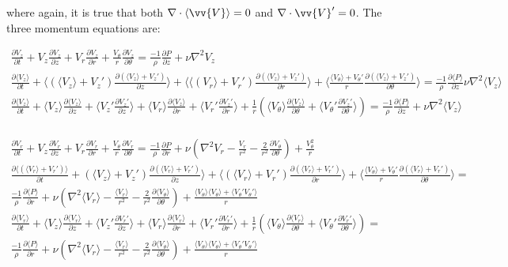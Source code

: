\documentclass[10pt]{article}
\newcommand{\beqa}{\begin{equation}\begin{aligned}}
\newcommand{\eeqa}{\end{aligned}\end{equation}}
\newcommand{\la}{\langle}
\newcommand{\ra}{\rangle}
\begin{document}
\begin{flushleft}
where again, it is true that both \(\nabla\cdot\la \vv{V}\ra=0\) and \(\nabla\cdot\vv{V}'=0\). The three momentum equations are:

\beqa
\frac{\partial V_z}{\partial t}+V_z\frac{\partial V_z}{\partial z}+V_r\frac{\partial V_z}{\partial r}+\frac{V_{\theta}}{r}\frac{\partial V_z}{\partial\theta}=\frac{-1}{\rho}\frac{\partial P}{\partial z}+\nu\nabla^2 V_z\\
\frac{\partial \la V_z\ra}{\partial t}+\la (\la V_z\ra + V_z')\frac{\partial (\la V_z\ra + V_z')}{\partial z}\ra+\la \la (V_r\ra+V_r')\frac{\partial (\la V_z\ra + V_z')}{\partial r}\ra+\la\frac{\la V_{\theta}\ra+V_{\theta}'}{r}\frac{\partial (\la V_z\ra + V_z')}{\partial\theta}\ra=\frac{-1}{\rho}\frac{\partial \la P\ra}{\partial z}\nu\nabla^2\la V_z\ra\\
\frac{\partial \la V_z\ra}{\partial t}+\la V_z\ra\frac{\partial \la V_z\ra}{\partial z}+\la V_z'\frac{\partial V_z'}{\partial z}\ra+\la V_r\ra\frac{\partial \la V_z\ra}{\partial r}+\la V_r'\frac{\partial V_z'}{\partial r}\ra+\frac{1}{r}\left(\la V_{\theta}\ra\frac{\partial\la V_z\ra}{\partial\theta}+\la V_{\theta}'\frac{\partial V_z'}{\partial \theta}\ra\right)=\frac{-1}{\rho}\frac{\partial \la P\ra}{\partial z}+\nu\nabla^2\la V_z\ra\\
\eeqa

\beqa
\frac{\partial V_r}{\partial t}+V_z\frac{\partial V_r}{\partial z}+V_r\frac{\partial V_r}{\partial r}+\frac{V_{\theta}}{r}\frac{\partial V_r}{\partial\theta}=\frac{-1}{\rho}\frac{\partial P}{\partial r}+\nu\left(\nabla^2 V_r-\frac{V_r}{r^2}-\frac{2}{r^2}\frac{\partial V_{\theta}}{\partial\theta}\right)+\frac{V_{\theta}^2}{r}\\
\frac{\partial \la(\la V_r\ra + V_r')\ra}{\partial t}+(\la V_z\ra+V_z')\frac{\partial (\la V_r\ra + V_r')}{\partial z}\ra+\la(\la V_r\ra + V_r')\frac{\partial (\la V_r\ra + V_r')}{\partial r}\ra+\la\frac{\la V_{\theta}\ra+V_{\theta}'}{r}\frac{\partial (\la V_r\ra + V_r')}{\partial\theta}\ra=\\
\frac{-1}{\rho}\frac{\partial \la P\ra}{\partial r}+\nu\left(\nabla^2 \la V_r\ra-\frac{\la V_r\ra}{r^2}-\frac{2}{r^2}\frac{\partial \la V_{\theta}\ra}{\partial\theta}\right)+\frac{\la V_{\theta}\ra\la V_{\theta}\ra+\la V_{\theta}'V_{\theta}'\ra}{r}\\
\frac{\partial \la V_r\ra}{\partial t}+\la V_z\ra\frac{\partial \la V_r\ra}{\partial z}+\la V_z'\frac{\partial V_r'}{\partial z}\ra+\la V_r\ra\frac{\partial\la V_r\ra}{\partial r}+\la V_r'\frac{\partial V_r'}{\partial r}\ra+\frac{1}{r}\left(\la V_{\theta}\ra\frac{\partial \la V_r\ra}{\partial\theta}+\la V_{\theta}'\frac{\partial V_r'}{\partial\theta}\ra\right)=\\
\frac{-1}{\rho}\frac{\partial \la P\ra}{\partial r}+\nu\left(\nabla^2 \la V_r\ra-\frac{\la V_r\ra}{r^2}-\frac{2}{r^2}\frac{\partial \la V_{\theta}\ra}{\partial\theta}\right)+\frac{\la V_{\theta}\ra\la V_{\theta}\ra+\la V_{\theta}'V_{\theta}'\ra}{r}\\
\eeqa


\end{flushleft}
\end{document}
